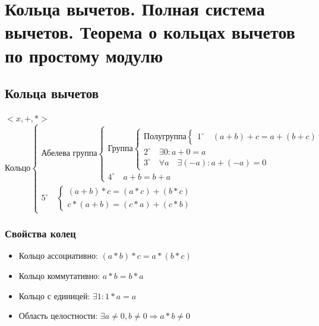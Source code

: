 \documentclass[12pt]{article}
\begin{document}
            \section{Кольца вычетов. Полная система вычетов. Теорема о кольцах вычетов по простому модулю}
            \subsection{Кольца вычетов}
        $<x,+,*>$
            \begin{equation*}
                \text{Кольцо}
                \begin{cases}
                    \text{Абелева группа}
                    \begin{cases}
                        \text{Группа}
                        \begin{cases}
                            \text{Полугруппа}
                            \begin{cases}
                                1^{\circ} \quad (a+b)+c = a+(b+c)
                            \end{cases}
                            \\
                            2^{\circ} \quad \exists 0: a+0 = a
                            \\
                            3^{\circ} \quad \forall a \quad\exists (-a): a + (-a) = 0
                        \end{cases}
                        \\
                        4^{\circ} \quad a + b = b + a
                    \end{cases}
                    \\
                    5^{\circ} \quad \begin{cases}
                                        (a+b)*c = (a*c) + (b*c)
                                        \\
                                        c*(a+b) = (c*a) + (c*b)
                                    \end{cases}
                \end{cases}
            \end{equation*}

            \subsubsection{Свойства колец}
            \begin{itemize}
                \item Кольцо ассоциативно: $(a*b)*c = a*(b*c)$
                \item Кольцо коммутативно: $a*b = b*a$
                \item Кольцо с единицей: $\exists 1: 1*a = a$
                \item Область целостности: $\exists a\ne 0, b \ne 0 \Rightarrow a*b \ne 0$
            \end{itemize}
\end{document}
